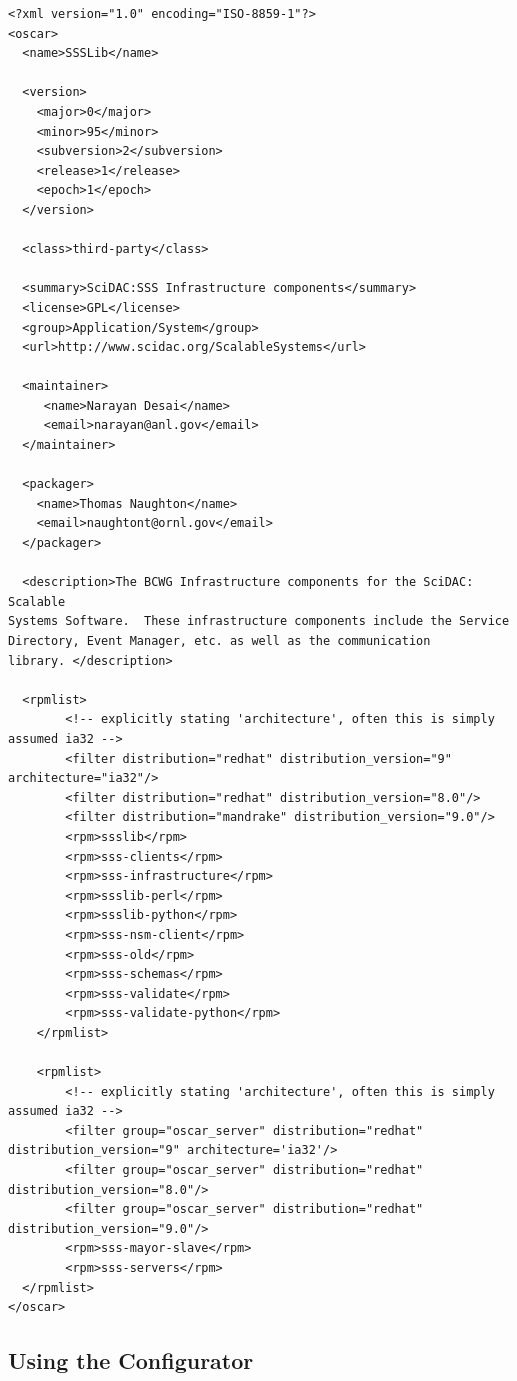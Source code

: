 \begin{scriptsize}
\begin{verbatim}
<?xml version="1.0" encoding="ISO-8859-1"?>
<oscar>
  <name>SSSLib</name>

  <version>
    <major>0</major>
    <minor>95</minor>
    <subversion>2</subversion>
    <release>1</release>
    <epoch>1</epoch>
  </version>

  <class>third-party</class>

  <summary>SciDAC:SSS Infrastructure components</summary>
  <license>GPL</license>
  <group>Application/System</group>
  <url>http://www.scidac.org/ScalableSystems</url>
  
  <maintainer>
     <name>Narayan Desai</name>
     <email>narayan@anl.gov</email>
  </maintainer>

  <packager>
    <name>Thomas Naughton</name>
    <email>naughtont@ornl.gov</email>
  </packager>

  <description>The BCWG Infrastructure components for the SciDAC: Scalable 
Systems Software.  These infrastructure components include the Service 
Directory, Event Manager, etc. as well as the communication 
library. </description>

  <rpmlist>
        <!-- explicitly stating 'architecture', often this is simply assumed ia32 -->
        <filter distribution="redhat" distribution_version="9" architecture="ia32"/>
        <filter distribution="redhat" distribution_version="8.0"/>
        <filter distribution="mandrake" distribution_version="9.0"/>
        <rpm>ssslib</rpm>
        <rpm>sss-clients</rpm>
        <rpm>sss-infrastructure</rpm>
        <rpm>ssslib-perl</rpm>
        <rpm>ssslib-python</rpm>
        <rpm>sss-nsm-client</rpm>
        <rpm>sss-old</rpm>
        <rpm>sss-schemas</rpm>
        <rpm>sss-validate</rpm>
        <rpm>sss-validate-python</rpm>
	</rpmlist>

	<rpmlist>
        <!-- explicitly stating 'architecture', often this is simply assumed ia32 -->
        <filter group="oscar_server" distribution="redhat" distribution_version="9" architecture='ia32'/>
        <filter group="oscar_server" distribution="redhat" distribution_version="8.0"/>
        <filter group="oscar_server" distribution="redhat" distribution_version="9.0"/>
        <rpm>sss-mayor-slave</rpm>
        <rpm>sss-servers</rpm>
  </rpmlist>
</oscar>
\end{verbatim}
\end{scriptsize}


\subsection{Using the Configurator}
\label{sect:example-configurator}

